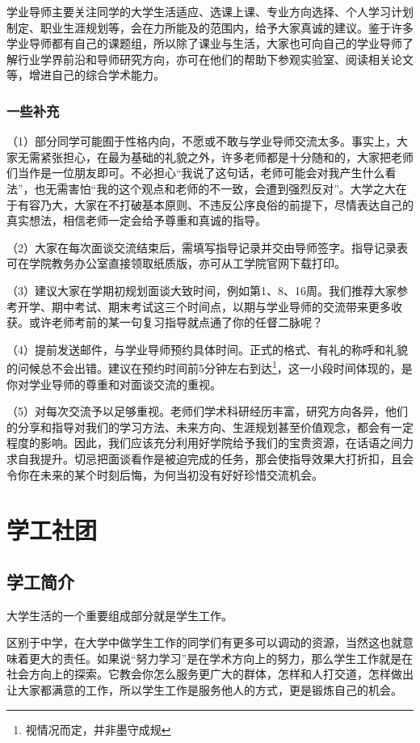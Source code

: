 \documentclass[11pt,oneside]{book}
\begin{document}
学业导师主要关注同学的大学生活适应、选课上课、专业方向选择、个人学习计划制定、职业生涯规划等，会在力所能及的范围内，给予大家真诚的建议。鉴于许多学业导师都有自己的课题组，所以除了课业与生活，大家也可向自己的学业导师了解行业学界前沿和导师研究方向，亦可在他们的帮助下参观实验室、阅读相关论文等，增进自己的综合学术能力。

\subsection{一些补充}

（1）部分同学可能囿于性格内向，不愿或不敢与学业导师交流太多。事实上，大家无需紧张担心，在最为基础的礼貌之外，许多老师都是十分随和的，大家把老师们当作是一位朋友即可。不必担心“我说了这句话，老师可能会对我产生什么看法”，也无需害怕“我的这个观点和老师的不一致，会遭到强烈反对”。大学之大在于有容乃大，大家在不打破基本原则、不违反公序良俗的前提下，尽情表达自己的真实想法，相信老师一定会给予尊重和真诚的指导。

（2）大家在每次面谈交流结束后，需填写指导记录并交由导师签字。指导记录表可在学院教务办公室直接领取纸质版，亦可从工学院官网下载打印。

（3）建议大家在学期初规划面谈大致时间，例如第1、8、16周。我们推荐大家参考开学、期中考试、期末考试这三个时间点，以期与学业导师的交流带来更多收获。或许老师考前的某一句复习指导就点通了你的任督二脉呢？

（4）提前发送邮件，与学业导师预约具体时间。正式的格式、有礼的称呼和礼貌的问候总不会出错。建议在预约时间前5分钟左右到达\footnote{视情况而定，并非墨守成规}，这一小段时间体现的，是你对学业导师的尊重和对面谈交流的重视。

（5）对每次交流予以足够重视。老师们学术科研经历丰富，研究方向各异，他们的分享和指导对我们的学习方法、未来方向、生涯规划甚至价值观念，都会有一定程度的影响。因此，我们应该充分利用好学院给予我们的宝贵资源，在话语之间力求自我提升。切忌把面谈看作是被迫完成的任务，那会使指导效果大打折扣，且会令你在未来的某个时刻后悔，为何当初没有好好珍惜交流机会。


\chapter{学工社团}
\section{学工简介}
大学生活的一个重要组成部分就是学生工作。

区别于中学，在大学中做学生工作的同学们有更多可以调动的资源，当然这也就意味着更大的责任。如果说“努力学习”是在学术方向上的努力，那么学生工作就是在社会方向上的探索。它教会你怎么服务更广大的群体，怎样和人打交道，怎样做出让大家都满意的工作，所以学生工作是服务他人的方式，更是锻炼自己的机会。
\end{document}
